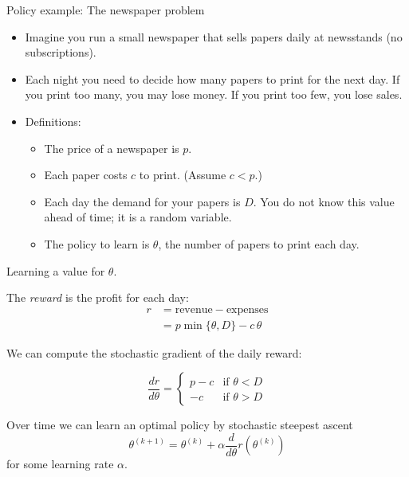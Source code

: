\documentclass[9pt]{beamer}
\begin{document}
\begin{frame}{Policy example: The newspaper problem}

\begin{itemize}
	\item Imagine you run a small newspaper that sells papers daily at newsstands (no subscriptions).
	\item Each night you need to decide how many papers to print for the next day. If you print too many, you may lose money. If you print too few, you lose sales.
	\item<2-> Definitions:
	\begin{itemize}\addtolength{\itemsep}{0.5\baselineskip}
		\item The price of a newspaper is $p$.
		\item Each paper costs $c$ to print. (Assume $c<p$.)
		\item Each day the demand for your papers is $D$. You do not know this value ahead of time; it is a random variable.
		\item The policy to learn is $\theta$, the number of papers to print each day.
	\end{itemize}
\end{itemize}
	
\end{frame}

\begin{frame}{Learning a value for $\theta$.}

The \emph{reward} is the profit for each day:
\begin{align*}
	r &= \text{revenue} - \text{expenses} \\
	&= p\min\{\theta,D\} - c\,\theta	
\end{align*}

\pause
We can compute the stochastic gradient of the daily reward:

\[ \frac{dr}{d\theta} = \begin{cases} p-c & \text{if } \theta < D \\
 -c & \text{if } \theta > D	
 \end{cases} \]
 
 \pause
 Over time we can learn an optimal policy by stochastic steepest ascent
 \[ \theta^{(k+1)} = \theta^{(k)} + \alpha \frac{d}{d\theta}r(\theta^{(k)}) \]
 for some learning rate $\alpha$.

\end{frame}
\end{document}
